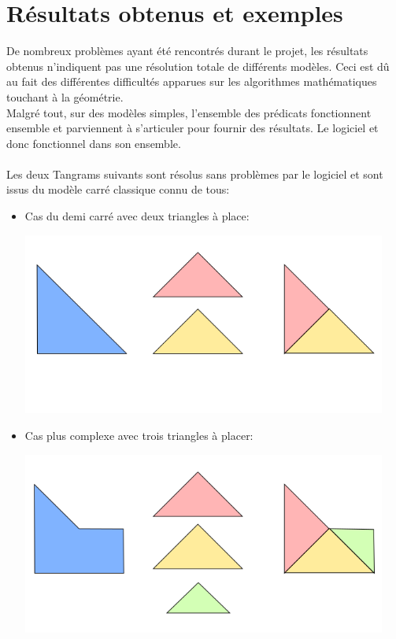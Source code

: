 \documentclass[a4paper, 11pt]{report}
\begin{document}
	\chapter{Résultats obtenus et exemples}
	
	De nombreux problèmes ayant été rencontrés durant le projet, les résultats obtenus n'indiquent pas une résolution totale de différents modèles. Ceci est d\^u au fait des différentes difficultés apparues sur les algorithmes mathématiques touchant à la géométrie.\\
	Malgré tout, sur des modèles simples, l'ensemble des prédicats fonctionnent ensemble et parviennent à s'articuler pour fournir des résultats. Le logiciel et donc fonctionnel dans son ensemble.\\ \ \\
	
	Les deux Tangrams suivants sont résolus sans problèmes par le logiciel et sont issus du modèle carré classique connu de tous:
	\begin{itemize}
		\item Cas du demi carré avec deux triangles à place:
		\begin{center}
			\includegraphics[width=12cm]{resultat_1}\\
		\end{center}
		\item Cas plus complexe avec trois triangles à placer:
		\begin{center}
			\includegraphics[width=12cm]{resultat_2}
		\end{center}
	\end{itemize}
	
\end{document}
